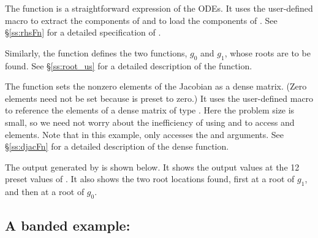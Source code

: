 The function  is a straightforward expression of the ODEs. 
It uses the user-defined macro  to extract the components of 
and to load the components of .
See \S\ref{ss:rhsFn} for a detailed specification of .

Similarly, the function  defines the two functions, $g_0$ and $g_1$,
whose roots are to be found.  See \S\ref{ss:root_us} for a detailed description
of the  function.

The function  sets the nonzero elements of the Jacobian as a
dense matrix.  (Zero elements need not be set because  is preset
to zero.)  It uses the user-defined macro  to reference the
elements of a dense matrix of type .  Here the problem
size is small, so we need not worry about the inefficiency of using
 and  to access  and
 elements.  Note that in this example, 
only accesses the  and  arguments.  See \S\ref{ss:djacFn}
for a detailed description of the dense  function.

The output generated by  is shown below.  It shows the output
values at the 12 preset values of .  It also shows the two root
locations found, first at a root of $g_1$, and then at a root of $g_0$.



\subsection{A banded example: }\label{ss:cvbx}


